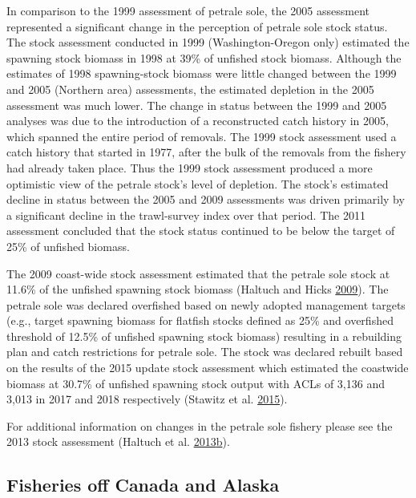 \documentclass[12pt,]{article}
\begin{document}
In comparison to the 1999 assessment of petrale sole, the 2005
assessment represented a significant change in the perception of petrale
sole stock status. The stock assessment conducted in 1999
(Washington-Oregon only) estimated the spawning stock biomass in 1998 at
39\% of unfished stock biomass. Although the estimates of 1998
spawning-stock biomass were little changed between the 1999 and 2005
(Northern area) assessments, the estimated depletion in the 2005
assessment was much lower. The change in status between the 1999 and
2005 analyses was due to the introduction of a reconstructed catch
history in 2005, which spanned the entire period of removals. The 1999
stock assessment used a catch history that started in 1977, after the
bulk of the removals from the fishery had already taken place. Thus the
1999 stock assessment produced a more optimistic view of the petrale
stock's level of depletion. The stock's estimated decline in status
between the 2005 and 2009 assessments was driven primarily by a
significant decline in the trawl-survey index over that period. The 2011
assessment concluded that the stock status continued to be below the
target of 25\% of unfished biomass.

The 2009 coast-wide stock assessment estimated that the petrale sole
stock at 11.6\% of the unfished spawning stock biomass (Haltuch and
Hicks \protect\hyperlink{ref-haltuch_status_2009}{2009}). The petrale
sole was declared overfished based on newly adopted management targets
(e.g., target spawning biomass for flatfish stocks defined as 25\% and
overfished threshold of 12.5\% of unfished spawning stock biomass)
resulting in a rebuilding plan and catch restrictions for petrale sole.
The stock was declared rebuilt based on the results of the 2015 update
stock assessment which estimated the coastwide biomass at 30.7\% of
unfished spawning stock output with ACLs of 3,136 and 3,013 in 2017 and
2018 respectively (Stawitz et al.
\protect\hyperlink{ref-stawitz_stock_2015}{2015}).

For additional information on changes in the petrale sole fishery please
see the 2013 stock assessment (Haltuch et al.
\protect\hyperlink{ref-haltuch_status_2013}{2013}\protect\hyperlink{ref-haltuch_status_2013}{b}).

\subsection{Fisheries off Canada and
Alaska}\label{fisheries-off-canada-and-alaska}
\end{document}
